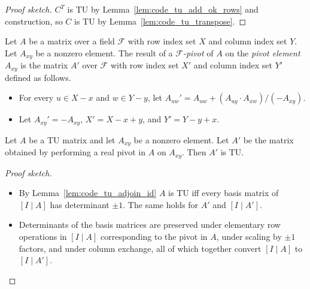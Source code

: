 \begin{proof}[Proof sketch]
  $C^{T}$ is TU by Lemma~\ref{lem:code_tu_add_ok_rows} and construction, so $C$ is TU by Lemma~\ref{lem:code_tu_transpose}.
\end{proof}

\begin{definition}
  \label{def:code_pivot}
  Let $A$ be a matrix over a field $\mathcal{F}$ with row index set $X$ and column index set $Y$.
  Let $A_{xy}$ be a nonzero element.
  The result of a \emph{$\mathcal{F}$-pivot} of $A$ on the \emph{pivot element} $A_{xy}$
  is the matrix $A'$ over $\mathcal{F}$ with row index set $X'$ and column index set $Y'$ defined as follows.
  \begin{itemize}
    \item For every $u \in X - x$ and $w \in Y - y$, let $A_{uw}' = A_{uw} + (A_{uy} \cdot A_{xw}) / (-A_{xy})$.
    \item Let $A_{xy}' = -A_{xy}$, $X' = X - x + y$, and $Y' = Y - y + x$.
  \end{itemize}
\end{definition}

\begin{lemma}
  \label{lem:code_pivot_tu}
  Let $A$ be a TU matrix and let $A_{xy}$ be a nonzero element.
  Let $A'$ be the matrix obtained by performing a real pivot in $A$ on $A_{xy}$.
  Then $A'$ is TU.
\end{lemma}

\begin{proof}[Proof sketch]
  \begin{itemize}
    \item By Lemma~\ref{lem:code_tu_adjoin_id} $A$ is TU iff every basis matrix of $\left[ I \mid A \right]$ has determinant $\pm 1$. The same holds for $A'$ and $\left[ I \mid A' \right]$.
    \item Determinants of the basis matrices are preserved under elementary row operations in $\left[ I \mid A \right]$ corresponding to the pivot in $A$, under scaling by $\pm 1$ factors, and under column exchange, all of which together convert $\left[ I \mid A \right]$ to $\left[ I \mid A' \right]$.
  \end{itemize}
\end{proof}

